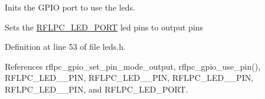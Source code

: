 Inits the G\-P\-I\-O port to use the leds. 

Sets the \hyperlink{group__config_gafc180ae44e9f400ffb8dd696d5b91c0e}{R\-F\-L\-P\-C\-\_\-\-L\-E\-D\-\_\-\-P\-O\-R\-T} led pins to output pins 

Definition at line 53 of file leds.\-h.



References rflpc\-\_\-gpio\-\_\-set\-\_\-pin\-\_\-mode\-\_\-output, rflpc\-\_\-gpio\-\_\-use\-\_\-pin(), R\-F\-L\-P\-C\-\_\-\-L\-E\-D\-\_\-\_\-\-P\-I\-N, R\-F\-L\-P\-C\-\_\-\-L\-E\-D\-\_\-\_\-\-P\-I\-N, R\-F\-L\-P\-C\-\_\-\-L\-E\-D\-\_\-\_\-\-P\-I\-N, R\-F\-L\-P\-C\-\_\-\-L\-E\-D\-\_\-\_\-\-P\-I\-N, and R\-F\-L\-P\-C\-\_\-\-L\-E\-D\-\_\-\-P\-O\-R\-T.

